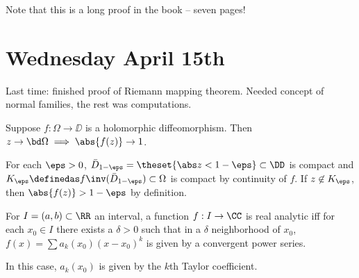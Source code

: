 Note that this is a long proof in the book -- seven pages!

\hypertarget{wednesday-april-15th}{%
\section{Wednesday April 15th}\label{wednesday-april-15th}}

Last time: finished proof of Riemann mapping theorem. Needed concept of
normal families, the rest was computations.

\begin{description}
\tightlist
\item[Proposition]
Suppose \(f: \Omega \to \DD\) is a holomorphic diffeomorphism. Then
\(z \to \bd \Omega \implies \abs{f(z)} \to 1\).
\item[Proof]
For each \(\eps > 0\),
\(\bar D_{1-\eps} = \theset {\abs z < 1- \eps}\subset \DD\) is compact
and \(K_\eps \definedas f\inv (\bar D_{1-\eps}) \subset \Omega\) is
compact by continuity of \(f\). If \(z\not\in K_\eps\), then
\(\abs{f(z)} > 1-\eps\) by definition.
\item[Definition]
For \(I = (a, b) \subset \RR\) an interval, a function \(f: I \to \CC\)
is real analytic iff for each \(x_0 \in I\) there exists a
\(\delta > 0\) such that in a \(\delta\) neighborhood of \(x_0\),
\(f(x) = \sum a_k(x_0) (x-x_0)^k\) is given by a convergent power
series.
\end{description}

In this case, \(a_k(x_0)\) is given by the \(k\)th Taylor coefficient.


